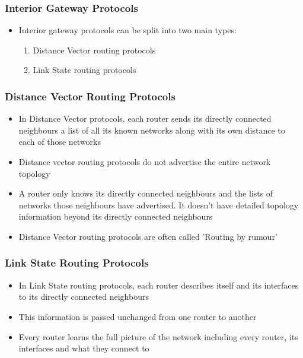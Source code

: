 \documentclass[pdflatex,compress,mathserif]{beamer}
\begin{document}
\begin{frame}
	\frametitle{Interior Gateway Protocols}
	\begin{itemize}
		\item Interior gateway protocols can be split into two main types:
		\begin{enumerate}
			\item Distance Vector routing protocols
			\item Link State routing protocols
		\end{enumerate}
	\end{itemize}
\end{frame}

\begin{frame}
	\frametitle{Distance Vector Routing Protocols}
	\begin{itemize}
		\item In Distance Vector protocols, each router sends its directly connected
neighbours a list of all its known networks along with its own distance to
each of those networks
		\item Distance vector routing protocols do not advertise the entire network
topology
		\item A router only knows its directly connected neighbours and the lists of
networks those neighbours have advertised. It doesn’t have detailed
topology information beyond its directly connected neighbours
		\item Distance Vector routing protocols are often called 'Routing by rumour'
	\end{itemize}
\end{frame}

\begin{frame}
	\frametitle{Link State Routing Protocols}
	\begin{itemize}
		\item In Link State routing protocols, each router describes itself and its
 interfaces to its directly connected neighbours
		\item This information is passed unchanged from one router to another
		\item Every router learns the full picture of the network including every router,
 its interfaces and what they connect to
	\end{itemize}
\end{frame}
\end{document}
